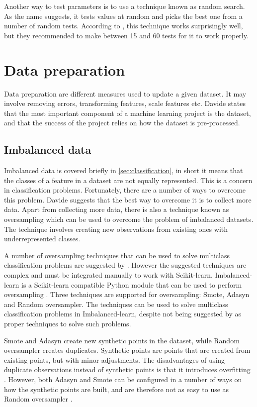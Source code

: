 	Another way to test parameters is to use a technique known as random search. As the name suggests, it tests values at random and picks the best one from a number of random tests. According to \cite{BOOK:9}, this technique works surprisingly well, but they recommended to make between 15 and 60 tests for it to work properly.

\section{Data preparation}
	Data preparation are different measures used to update a given dataset. It may involve removing errors, transforming features, scale features etc. Davide \cite{ARTICLE:4} states that the most important component of a machine learning project is the dataset, and that the success of the project relies on how the dataset is pre-processed.

	\subsection{Imbalanced data} \label{sec:imbalancedtheory}
	Imbalanced data is covered briefly in \ref{sec:classification}, in short it means that the classes of a feature in a dataset are not equally represented. This is a concern in classification problems. Fortunately, there are a number of ways to overcome this problem. Davide \cite{ARTICLE:4} suggests that the best way to overcome it is to collect more data. Apart from collecting more data, there is also a technique known as oversampling which can be used to overcome the problem of imbalanced datasets. The technique involves creating new observations from existing ones with underrepresented classes.

	A number of oversampling techniques that can be used to solve multiclass classification problems are suggested by \cite{IP:6}. However the suggested techniques are complex and must be integrated manually to work with Scikit-learn. Imbalanced-learn is a Scikit-learn compatible Python module that can be used to perform oversampling \cite{WEBSITE:22}. Three techniques are supported for oversampling: Smote, Adasyn and Random oversampler. The techniques can be used to solve multiclass classification problems in Imbalanced-learn, despite not being suggested by \cite{IP:6} as proper techniques to solve such problems. 

	Smote and Adasyn create new synthetic points in the dataset, while Random oversampler creates duplicates. Synthetic points are points that are created from existing points, but with minor adjustments. The disadvantages of using duplicate observations instead of synthetic points is that it introduces overfitting \cite{BOOK:12}. However, both Adasyn and Smote can be configured in a number of ways on how the synthetic points are built, and are therefore not as easy to use as Random oversampler \cite{WEBSITE:23}. 
	
